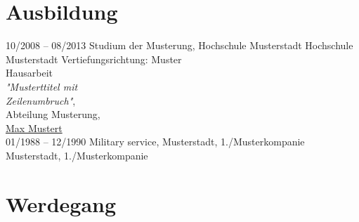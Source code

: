 \documentclass[hidelinks]{friggeri-cv}
\begin{document}
    \vspace*{1ex}
    \section{Ausbildung}
    
    \begin{entrylist}
        \entry
        {10/2008 -- 08/2013}
        {Studium der Musterung, {\normalfont Hochschule Musterstadt}}
        {Hochschule Musterstadt}
        {Vertiefungsrichtung: Muster
         \vspace*{1ex}\\
         \normalfont Hausarbeit\\
         \emph{"Musterttitel mit \\ Zeilenumbruch"}, 
         \\\textnormal\small{Abteilung Musterung, 
         \\\textsc\small{\href{https://www.maxmustermann.de/}{Max Mustert}}}
         \vspace*{0.2ex}\\
         }
         \entry
        {01/1988 -- 12/1990}
        {Military service, {\normalfont Musterstadt, 1./Musterkompanie}}
        {Musterstadt, 1./Musterkompanie}
        {}
    \end{entrylist}
    \vspace*{-3ex}
    \section{Werdegang}
    
\end{document}
